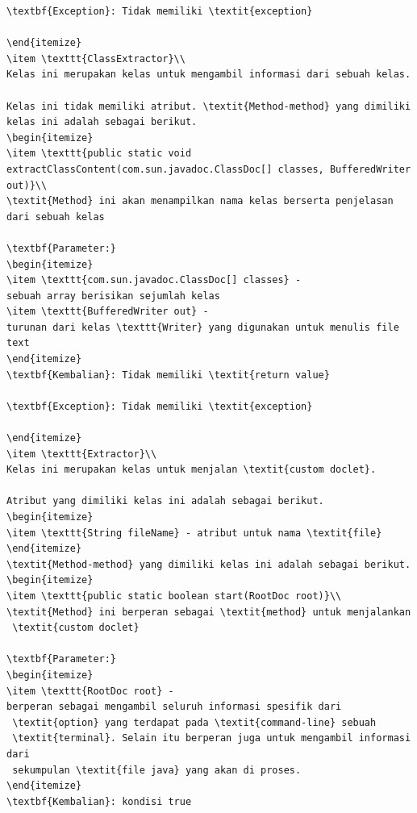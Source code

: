 \documentclass[a4paper,twoside]{article}
\begin{document}
\begin{enumerate}
\begin{lstlisting}[caption=Hasil Implementasi]
\textbf{Exception}: Tidak memiliki \textit{exception}

\end{itemize}
\item \texttt{ClassExtractor}\\ 
Kelas ini merupakan kelas untuk mengambil informasi dari sebuah kelas.

Kelas ini tidak memiliki atribut. \textit{Method-method} yang dimiliki kelas ini adalah sebagai berikut.
\begin{itemize}
\item \texttt{public static void extractClassContent(com.sun.javadoc.ClassDoc[] classes, BufferedWriter out)}\\ 
\textit{Method} ini akan menampilkan nama kelas berserta penjelasan dari sebuah kelas

\textbf{Parameter:}
\begin{itemize}
\item \texttt{com.sun.javadoc.ClassDoc[] classes} - 
sebuah array berisikan sejumlah kelas
\item \texttt{BufferedWriter out} - 
turunan dari kelas \texttt{Writer} yang digunakan untuk menulis file text
\end{itemize}
\textbf{Kembalian}: Tidak memiliki \textit{return value}

\textbf{Exception}: Tidak memiliki \textit{exception}

\end{itemize}
\item \texttt{Extractor}\\ 
Kelas ini merupakan kelas untuk menjalan \textit{custom doclet}.

Atribut yang dimiliki kelas ini adalah sebagai berikut.
\begin{itemize}
\item \texttt{String fileName} - atribut untuk nama \textit{file}
\end{itemize}
\textit{Method-method} yang dimiliki kelas ini adalah sebagai berikut.
\begin{itemize}
\item \texttt{public static boolean start(RootDoc root)}\\ 
\textit{Method} ini berperan sebagai \textit{method} untuk menjalankan
 \textit{custom doclet}

\textbf{Parameter:}
\begin{itemize}
\item \texttt{RootDoc root} - 
berperan sebagai mengambil seluruh informasi spesifik dari
 \textit{option} yang terdapat pada \textit{command-line} sebuah
 \textit{terminal}. Selain itu berperan juga untuk mengambil informasi dari
 sekumpulan \textit{file java} yang akan di proses.
\end{itemize}
\textbf{Kembalian}: kondisi true


\end{lstlisting}
\end{enumerate}
\end{document}
